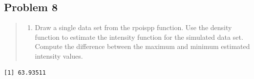 \documentclass[
  letterpaper,
  DIV=11,
  numbers=noendperiod]{scrartcl}
\newenvironment{Shaded}{\begin{snugshade}}{\end{snugshade}}
\newcommand{\AttributeTok}[1]{\textcolor[rgb]{0.40,0.45,0.13}{#1}}
\newcommand{\DecValTok}[1]{\textcolor[rgb]{0.68,0.00,0.00}{#1}}
\newcommand{\FunctionTok}[1]{\textcolor[rgb]{0.28,0.35,0.67}{#1}}
\newcommand{\NormalTok}[1]{\textcolor[rgb]{0.00,0.23,0.31}{#1}}
\newcommand{\OtherTok}[1]{\textcolor[rgb]{0.00,0.23,0.31}{#1}}
\newcommand{\SpecialCharTok}[1]{\textcolor[rgb]{0.37,0.37,0.37}{#1}}
\providecommand{\tightlist}{%
  \setlength{\itemsep}{0pt}\setlength{\parskip}{0pt}}\usepackage{longtable,booktabs,array}
\begin{document}
\hypertarget{problem-8}{%
\subsection{Problem 8}\label{problem-8}}

\begin{quote}
\begin{enumerate}
\def\labelenumi{\arabic{enumi}.}
\tightlist
\item
  Draw a single data set from the rpoispp function. Use the density
  function to estimate the intensity function for the simulated data
  set. Compute the difference between the maximum and minimum estimated
  intensity values.
\end{enumerate}
\end{quote}

\begin{Shaded}
\end{Shaded}

\begin{verbatim}
[1] 63.93511
\end{verbatim}
\end{document}
